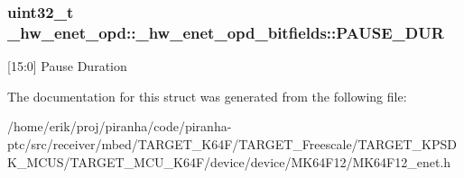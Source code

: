 \subsubsection[{\texorpdfstring{P\+A\+U\+S\+E\+\_\+\+D\+UR}{PAUSE_DUR}}]{\setlength{\rightskip}{0pt plus 5cm}uint32\+\_\+t \+\_\+hw\+\_\+enet\+\_\+opd\+::\+\_\+hw\+\_\+enet\+\_\+opd\+\_\+bitfields\+::\+P\+A\+U\+S\+E\+\_\+\+D\+UR}\hypertarget{struct__hw__enet__opd_1_1__hw__enet__opd__bitfields_ae5a8e75cfa6c27817d362968d0918213}{}\label{struct__hw__enet__opd_1_1__hw__enet__opd__bitfields_ae5a8e75cfa6c27817d362968d0918213}
\mbox{[}15\+:0\mbox{]} Pause Duration 

The documentation for this struct was generated from the following file\+:\begin{DoxyCompactItemize}
\item 
/home/erik/proj/piranha/code/piranha-\/ptc/src/receiver/mbed/\+T\+A\+R\+G\+E\+T\+\_\+\+K64\+F/\+T\+A\+R\+G\+E\+T\+\_\+\+Freescale/\+T\+A\+R\+G\+E\+T\+\_\+\+K\+P\+S\+D\+K\+\_\+\+M\+C\+U\+S/\+T\+A\+R\+G\+E\+T\+\_\+\+M\+C\+U\+\_\+\+K64\+F/device/device/\+M\+K64\+F12/M\+K64\+F12\+\_\+enet.\+h\end{DoxyCompactItemize}

